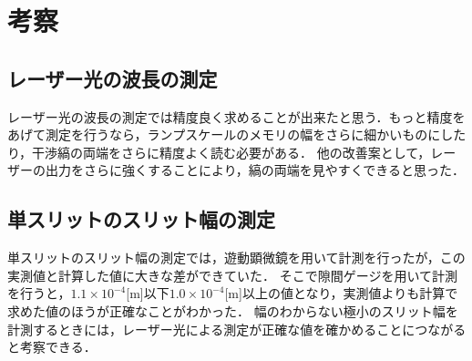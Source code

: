 \documentclass[a4paper,11pt]{ltjsarticle}
\begin{document}
\section{考察}
\subsection{レーザー光の波長の測定}
レーザー光の波長の測定では精度良く求めることが出来たと思う．もっと精度をあげて測定を行うなら，ランプスケールのメモリの幅をさらに細かいものにしたり，干渉縞の両端をさらに精度よく読む必要がある．
他の改善案として，レーザーの出力をさらに強くすることにより，縞の両端を見やすくできると思った．
\subsection{単スリットのスリット幅の測定}
単スリットのスリット幅の測定では，遊動顕微鏡を用いて計測を行ったが，この実測値と計算した値に大きな差ができていた．
そこで隙間ゲージを用いて計測を行うと，$1.1\times 10^{-4}$[m]以下$1.0\times 10^{-4}$[m]以上の値となり，実測値よりも計算で求めた値のほうが正確なことがわかった．
幅のわからない極小のスリット幅を計測するときには，レーザー光による測定が正確な値を確かめることにつながると考察できる．
\end{document}
